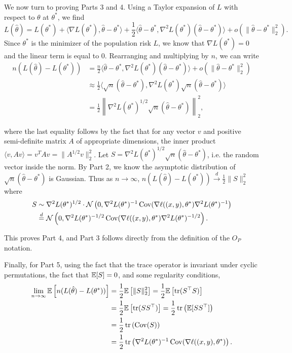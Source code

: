 We now turn to proving Parts 3 and 4. Using a Taylor expansion of $L$ with respect to $\theta$ at $\theta^*$, we find
\begin{equation}
L(\hat \theta) = L(\theta^*) 
+ \langle \nabla L(\theta^*), \hat \theta - \theta^* \rangle 
+ \frac12 \langle \hat \theta - \theta^*, \nabla^2 L(\theta^*) (\hat \theta - \theta^*) \rangle + o(\|\hat \theta - \theta^*\|_2^2).
\end{equation}
Since $\theta^*$ is the minimizer of the population risk $L$, we know that $\nabla L(\theta^*) = 0$ and the linear term is equal to 0. Rearranging and multiplying by $n$, we can write
\begin{align}
n (L(\hat \theta) - L(\theta^*)) &= \frac{n}{2} \langle \hat \theta - \theta^*, \nabla^2 L(\theta^*) (\hat \theta - \theta^*) \rangle + o(\|\hat \theta - \theta^*\|_2^2) \\
&\approx \frac12 \langle \sqrt n(\hat \theta - \theta^*), \nabla^2 L(\theta^*) \sqrt n (\hat \theta - \theta^*) \rangle \\
&= \frac12 \left\|\nabla^2 L(\theta^*)^{1/2} \sqrt n(\hat \theta - \theta^*) \right\|_2^2,
\end{align}

where the last equality follows by the fact that for any vector $v$ and positive semi-definite matrix $A$ of appropriate dimensions, the inner product $\langle v, Av\rangle = v^T Av = \lVert A^{1/2}v \rVert_2^2$. Let $S = \nabla^2 L(\theta^*)^{1/2} \sqrt n(\hat \theta - \theta^*)$, i.e. the random vector inside the norm. By Part 2, we know the asymptotic distribution of $\sqrt n(\hat \theta - \theta^*)$ is Gaussian. Thus as $n \to \infty$, $n (L(\hat \theta) - L(\theta^*)) \overset d \to \frac12 \|S\|_2^2$ where
\begin{align}
    S &\sim \nabla^2 L(\theta^*)^{1/2} \cdot \mathcal N \left(0, \nabla^2 L(\theta^*)^{-1} \operatorname{Cov}(\nabla \ell ((x, y), \theta^*) \nabla^2 L(\theta^*)^{-1} \right) \\
    &\stackrel{d}{=} \mathcal N \left(0, \nabla^2 L(\theta^*)^{-1/2} \operatorname{Cov}(\nabla \ell ((x, y), \theta^*) \nabla^2 L(\theta^*)^{-1/2} \right).
\end{align}

This proves Part 4, and Part 3 follows directly from the definition of the $O_P$ notation.

Finally, for Part 5, using the fact that the trace operator is invariant under cyclic permutations, the fact that $\mathbb{E} [S] = 0$, and some regularity conditions,
\begin{align}
    \lim_{n \to \infty} \mathbb{E} \left[ n (L(\hat \theta) - L(\theta^*)) \right] &= \frac12 \mathbb{E}\left[ \|S\|_2^2 \right] = \frac12 \mathbb{E} \left[ \operatorname{tr}(S^\top S) \right] \\
    &= \frac12 \mathbb{E} \left[ \operatorname{tr}(S S^\top) \right]  = \frac12 \operatorname{tr} \left(\mathbb{E}[S S^\top] \right) \\
    &= \frac12 \operatorname{tr} \left( \operatorname{Cov}(S) \right) \\
    &= \frac12 \operatorname{tr}\left( \nabla^2 L(\theta^*)^{-1} \operatorname{Cov}(\nabla \ell ((x, y), \theta^*) \right).
\end{align}

